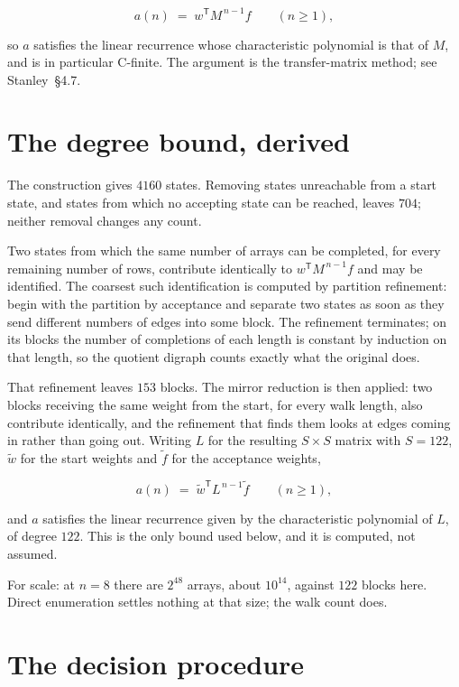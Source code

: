 \documentclass[11pt]{article}
\theoremstyle{definition}
\begin{document}
\[a(n) \;=\; w^{\mathsf T} M^{\,n-1} f \qquad (n \ge 1),\]

so $a$ satisfies the linear recurrence whose characteristic polynomial is that of $M$, and is in particular C-finite. The argument is the transfer-matrix method; see Stanley~\S4.7.

\section{The degree bound, derived}

The construction gives $4160$ states. Removing states unreachable from a start state, and states from which no accepting state can be reached, leaves $704$; neither removal changes any count.

Two states from which the same number of arrays can be completed, for every remaining number of rows, contribute identically to $w^{\mathsf T}M^{\,n-1}f$ and may be identified. The coarsest such identification is computed by partition refinement: begin with the partition by acceptance and separate two states as soon as they send different numbers of edges into some block. The refinement terminates; on its blocks the number of completions of each length is constant by induction on that length, so the quotient digraph counts exactly what the original does.

That refinement leaves $153$ blocks. The mirror reduction is then applied: two blocks receiving the same weight from the start, for every walk length, also contribute identically, and the refinement that finds them looks at edges coming in rather than going out. Writing $L$ for the resulting $S \times S$ matrix with $S = 122$, $\tilde w$ for the start weights and $\tilde f$ for the acceptance weights,

\[a(n) \;=\; \tilde w^{\mathsf T} L^{\,n-1} \tilde f \qquad (n \ge 1),\]

and $a$ satisfies the linear recurrence given by the characteristic polynomial of $L$, of degree $122$. This is the only bound used below, and it is computed, not assumed.

For scale: at $n = 8$ there are $2^{48}$ arrays, about $10^{14}$, against $122$ blocks here. Direct enumeration settles nothing at that size; the walk count does.

\section{The decision procedure}
\end{document}

